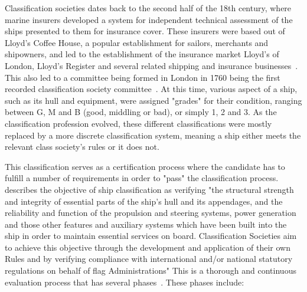Classification societies dates back to the second half of the 18th century, where marine insurers developed a system for independent technical assessment of the ships
presented to them for insurance cover. These insurers were based out of Lloyd's Coffee House, a popular establishment for sailors, merchants and shipowners, and led to
the establishment of the insurance market Lloyd's of London, Lloyd's Register and several related shipping and insurance businesses~\cite{Marcus1975}.
This also led to a committee being formed in London in 1760 being the first recorded classification society committee~\citep{Hormann2006}. 
At this time, various aspect of a ship, such as its hull and equipment, were assigned "grades" for their condition, ranging between G, M and B (good, middling or bad), 
or simply 1, 2 and 3. As the classification profession evolved, these different classifications were mostly replaced by a more discrete classification system, meaning
a ship either meets the relevant class society's rules or it does not. 

This classification serves as a certification process where the candidate 
has to fulfill a number of requirements in order to "pass" the classification process. 
\citet{Hormann2006} describes the objective of ship classification as verifying "the structural strength and integrity of essential parts of the ship’s hull 
and its appendages, and the reliability and function of the propulsion and steering systems, power generation and those other features and auxiliary systems 
which have been built into the ship in order to maintain essential services on board. Classification Societies aim to achieve this objective through the development 
and application of their own Rules and by verifying compliance with international and/or national statutory regulations on behalf of flag Administrations"
This is a thorough and continuous evaluation process that has several phases~\citep{Hormann2006}. These phases include:

